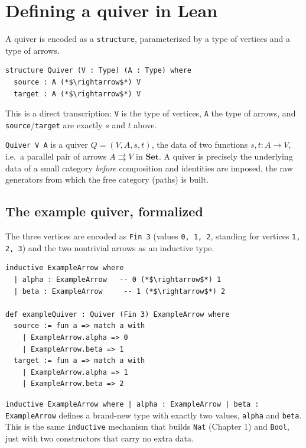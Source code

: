 \section{Defining a quiver in Lean}\label{sec:12-path-algebras:03-defining-a-quiver:1}

A quiver is encoded as a \texttt{structure}, parameterized by a type of vertices and a type of arrows.

\begin{lstlisting}
structure Quiver (V : Type) (A : Type) where
  source : A (*$\rightarrow$*) V
  target : A (*$\rightarrow$*) V
\end{lstlisting}

This is a direct transcription: \texttt{V} is the type of vertices, \texttt{A} the type of arrows, and \texttt{source}/\texttt{target} are exactly \(s\) and \(t\) above.

\begin{mathreading}

\texttt{Quiver V A} is a quiver \(Q = (V, A, s, t)\), the data of two functions \(s, t : A \to V\), i.e.~a parallel pair of arrows \(A \rightrightarrows V\) in \(\mathbf{Set}\). A quiver is precisely the underlying data of a small category \emph{before} composition and identities are imposed, the raw generators from which the free category (paths) is built.

\end{mathreading}

\subsection{The example quiver, formalized}\label{sec:12-path-algebras:03-defining-a-quiver:2}

The three vertices are encoded as \texttt{Fin 3} (values \texttt{0, 1, 2}, standing for vertices \texttt{1, 2, 3}) and the two nontrivial arrows as an inductive type.

\begin{lstlisting}
inductive ExampleArrow where
  | alpha : ExampleArrow   -- 0 (*$\rightarrow$*) 1
  | beta : ExampleArrow     -- 1 (*$\rightarrow$*) 2

def exampleQuiver : Quiver (Fin 3) ExampleArrow where
  source := fun a => match a with
    | ExampleArrow.alpha => 0
    | ExampleArrow.beta => 1
  target := fun a => match a with
    | ExampleArrow.alpha => 1
    | ExampleArrow.beta => 2
\end{lstlisting}

\texttt{inductive ExampleArrow where | alpha : ExampleArrow | beta : ExampleArrow} defines a brand-new type with exactly two values, \texttt{alpha} and \texttt{beta}. This is the same \texttt{inductive} mechanism that builds \texttt{Nat} (Chapter 1) and \texttt{Bool}, just with two constructors that carry no extra data.

